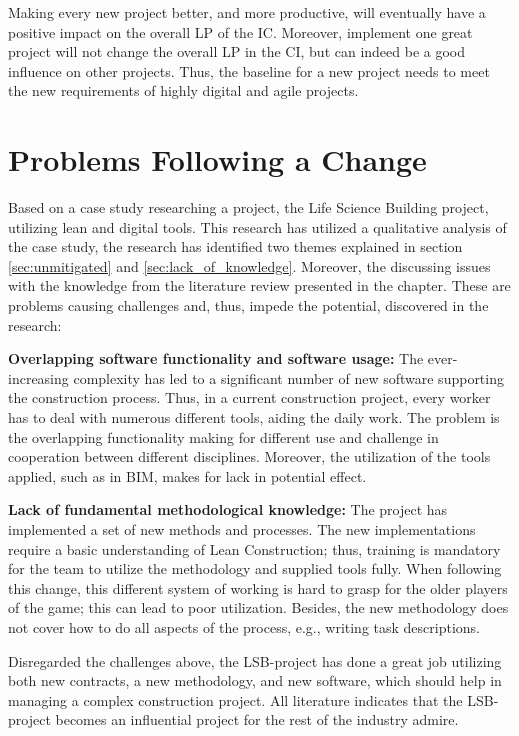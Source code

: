 Making every new project better, and more productive, will eventually have a positive impact on the overall LP of the IC. Moreover, implement one great project will not change the overall LP in the CI, but can indeed be a good influence on other projects. Thus, the baseline for a new project needs to meet the new requirements of highly digital and agile projects.

\section{Problems Following a Change} \label{sec:rq2}
Based on a case study researching a project, the Life Science Building project, utilizing lean and digital tools. This research has utilized a qualitative analysis of the case study, the research has identified two themes explained in section \ref{sec:unmitigated} and \ref{sec:lack_of_knowledge}. Moreover, the discussing issues with the knowledge from the literature review presented in the  chapter. These are problems causing challenges and, thus, impede the potential, discovered in the research:
    
{\bf Overlapping software functionality and software usage:} The ever-increasing complexity has led to a significant number of new software supporting the construction process. Thus, in a current construction project, every worker has to deal with numerous different tools, aiding the daily work. The problem is the overlapping functionality making for different use and challenge in cooperation between different disciplines. Moreover, the utilization of the tools applied, such as in BIM, makes for lack in potential effect.  
    
{\bf Lack of fundamental methodological knowledge:} The project has implemented a set of new methods and processes. The new implementations require a basic understanding of Lean Construction; thus, training is mandatory for the team to utilize the methodology and supplied tools fully. When following this change, this different system of working is hard to grasp for the older players of the game; this can lead to poor utilization. Besides, the new methodology does not cover how to do all aspects of the process, e.g., writing task descriptions.

Disregarded the challenges above, the LSB-project has done a great job utilizing both new contracts, a new methodology, and new software, which should help in managing a complex construction project. All literature indicates that the LSB-project becomes an influential project for the rest of the industry admire. 

